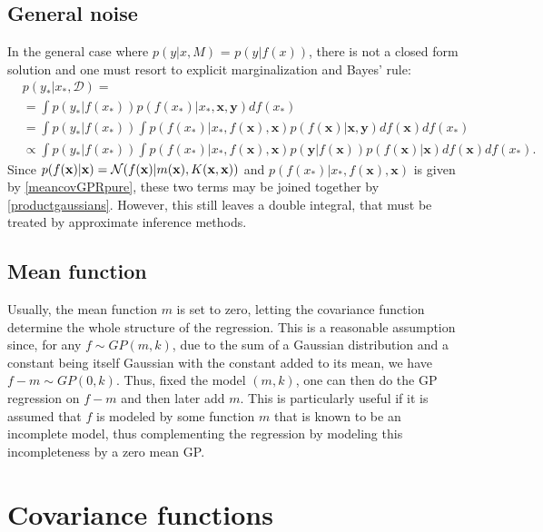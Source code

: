 \subsection{General noise}
In the general case where $p(y|x,M)$ = $p(y|f(x))$, there is not a closed form solution and one must resort to explicit marginalization and Bayes' rule:
\begin{equation}\label{generalnoise}
\begin{split}
 & p(y_*|x_*,\mathcal{D}) = \\  & = 
  \int p(y_*|f(x_*)) p(f(x_*)|x_*,\mathbf{x},\mathbf{y}) df(x_*)\\ & = 
  \int p(y_*|f(x_*)) \int p(f(x_*)|x_*,f(\mathbf{x}), \mathbf{x}) p(f(\mathbf{x}) | \mathbf{x},\mathbf{y}) df(\mathbf{x}) df(x_*) \\ & \propto
  \int p(y_*|f(x_*)) \int p(f(x_*)|x_*,f(\mathbf{x}), \mathbf{x}) p(\mathbf{y}|f(\mathbf{x})) p(f(\mathbf{x})|\mathbf{x}) df(\mathbf{x})df(x_*).
 \end{split}
\end{equation}
Since $p(f(\mathbf{x})|{\mathbf x}) = \mathcal{N}(f(\mathbf{x})|m(\mathbf{x}),K(\mathbf{x},\mathbf{x}))$ and $p(f(x_*)|x_*,f(\mathbf{x}), \mathbf{x})$ is given by \eqref{meancovGPRpure}, these two terms may be joined together by \eqref{productgaussians}. However, this still leaves a double integral, that must be treated by approximate inference methods.

\subsection{Mean function}
Usually, the mean function $m$ is set to zero, letting the covariance function determine the whole structure of the regression. This is a reasonable assumption since, for any $f \sim GP(m,k)$, due to the sum of a Gaussian distribution and a constant being itself Gaussian with the constant added to its mean, we have $f-m \sim GP(0,k)$. Thus, fixed the model $(m,k)$, one can then do the GP regression on $f-m$ and then later add $m$. This is particularly useful if it is assumed that $f$ is modeled by some function $m$ that is known to be an incomplete model, thus complementing the regression by modeling this incompleteness by a zero mean GP.

\section{Covariance functions}


